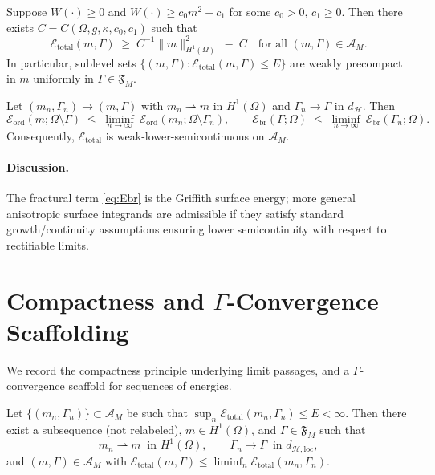 \begin{proposition}[Coercivity]\label{prop:coercivity}
Suppose $W(\cdot)\ge 0$ and $W(\cdot)\ge c_0 m^2 - c_1$ for some $c_0>0$, $c_1\ge 0$. Then there exists $C=C(\Omega,g,\kappa,c_0,c_1)$ such that
\[
  \mathcal{E}_{\mathrm{total}}(m,\Gamma) \;\ge\; C^{-1}\|m\|_{H^1(\Omega)}^2 \;-\; C \quad \text{for all } (m,\Gamma)\in\mathcal{A}_M.
\]
In particular, sublevel sets $\{(m,\Gamma): \mathcal{E}_{\mathrm{total}}(m,\Gamma)\le E\}$ are weakly precompact in $m$ uniformly in $\Gamma\in\mathfrak{F}_M$.
\end{proposition}

\begin{proposition}\label{prop:lsc}
Let $(m_n,\Gamma_n)\to(m,\Gamma)$ with $m_n\rightharpoonup m$ in $H^1(\Omega)$ and $\Gamma_n\to\Gamma$ in $d_{\mathcal{H}}$. Then
\[
  \mathcal{E}_{\mathrm{ord}}(m;\Omega\setminus\Gamma) \;\le\; \liminf_{n\to\infty}\ \mathcal{E}_{\mathrm{ord}}(m_n;\Omega\setminus\Gamma_n),
\qquad
  \mathcal{E}_{\mathrm{br}}(\Gamma;\Omega) \;\le\; \liminf_{n\to\infty}\ \mathcal{E}_{\mathrm{br}}(\Gamma_n;\Omega).
\]
Consequently, $\mathcal{E}_{\mathrm{total}}$ is weak-lower-semicontinuous on $\mathcal{A}_M$.
\end{proposition}

\paragraph{Discussion.}
The fractural term \eqref{eq:Ebr} is the Griffith surface energy; more general anisotropic surface integrands are admissible if they satisfy standard growth/continuity assumptions ensuring lower semicontinuity with respect to rectifiable limits.

\section{Compactness and $\Gamma$-Convergence Scaffolding}\label{sec:gamma}
We record the compactness principle underlying limit passages, and a $\Gamma$-convergence scaffold for sequences of energies.

\begin{theorem}\label{thm:compactness}
Let $\{(m_n,\Gamma_n)\}\subset\mathcal{A}_M$ be such that $\sup_n \mathcal{E}_{\mathrm{total}}(m_n,\Gamma_n)\le E<\infty$.
Then there exist a subsequence (not relabeled), $m\in H^1(\Omega)$, and $\Gamma\in\mathfrak{F}_M$ such that
\[
  m_n \rightharpoonup m \ \text{ in } H^1(\Omega), 
  \qquad 
  \Gamma_n \to \Gamma \ \text{ in } d_{\mathcal{H},\mathrm{loc}},
\]
and $(m,\Gamma)\in\mathcal{A}_M$ with $\mathcal{E}_{\mathrm{total}}(m,\Gamma)\le \liminf_n \mathcal{E}_{\mathrm{total}}(m_n,\Gamma_n)$.
\end{theorem}

